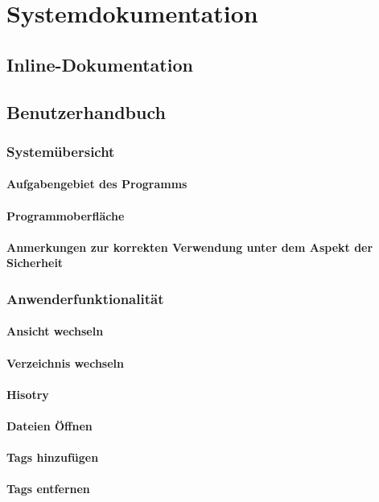 \documentclass[10pt,paper=a4,final]{scrartcl}
\begin{document}
\section{Systemdokumentation}
\subsection{Inline-Dokumentation}
\subsection{Benutzerhandbuch}
\subsubsection{System\"ubersicht}
\paragraph{Aufgabengebiet des Programms}
\paragraph{Programmoberfl\"ache}
\paragraph{Anmerkungen zur korrekten Verwendung unter dem Aspekt der Sicherheit}
\subsubsection{Anwenderfunktionalit\"at}
\paragraph{Ansicht wechseln}
\paragraph{Verzeichnis wechseln}
\paragraph{Hisotry}
\paragraph{Dateien \"Offnen}
\paragraph{Tags hinzuf\"ugen}
\paragraph{Tags entfernen}
\end{document}
